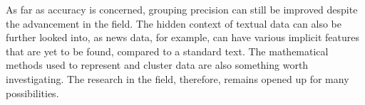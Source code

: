 \documentclass[english]{tktltiki}
\begin{document}
As far as accuracy is concerned, grouping precision can still be improved despite the advancement in the field. The hidden context of textual data can also be further looked into, as news data, for example, can have various implicit features that are yet to be found, compared to a standard text. The mathematical methods used to represent and cluster data are also something worth investigating. The research in the field, therefore, remains opened up for many possibilities.

\pagebreak

%
%


\nocite{*}
%
%
%

%





\lastpage

\appendices

\pagestyle{empty}
\end{document}
